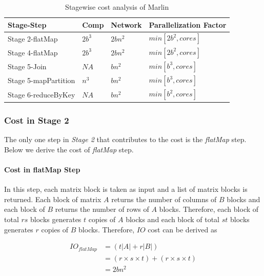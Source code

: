 
\begin{table}[h!]
	\caption{Stagewise cost analysis of Marlin}
	\label{tab:marlinCost}
	\begin{minipage}{\columnwidth}
		\begin{center}
			\begin{tabular}{llll}
				\toprule
				Stage-Step & Comp & Network & Parallelization Factor \\
				\toprule
				Stage 2-flatMap & $2b^{3}$ & $2bn^{2}$ & $min[2b^{2}, cores]$ \\
				Stage 4-flatMap & $2b^{3}$ & $2bn^{2}$ & $min[2b^{2}, cores]$ \\
				Stage 5-Join & $NA$ & $bn^{2}$ & $min[b^{3}, cores]$ \\
				Stage 5-mapPartition & $n^{3}$ & $bn^{2}$ & $min[b^{3}, cores]$ \\
				Stage 6-reduceByKey & $NA$ & $bn^{2}$ & $min[b^{2}, cores]$ \\
				\bottomrule
			\end{tabular}
		\end{center}
	\end{minipage}
\end{table}

\subsubsection{Cost in Stage 2}
The only one step in \textit{Stage 2} that contributes to the cost is the \textit{flatMap} step. Below we derive the cost of \textit{flatMap} step.

\paragraph{Cost in flatMap Step}
In this step, each matrix block is taken as input and a list of matrix blocks is returned. Each block of matrix $A$ returns the number of columns of $B$ blocks and each block of $B$ returns the number of rows of $A$ blocks. Therefore, each block of total $rs$ blocks generates $t$ copies of $A$ blocks and each block of total $st$ blocks generates $r$ copies of $B$ blocks. Therefore, $IO$ cost can be derived as

\begin{equation}
    \begin{aligned}
        IO_{flatMap}&=(t\left | A \right |+r\left | B \right |) \\
        &=(r\times s\times t)+(r\times s\times t) \\
        &=2bn^{2}
    \end{aligned}
\end{equation}

